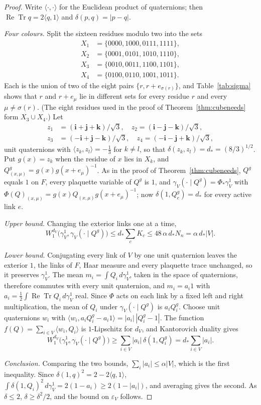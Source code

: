 \documentclass[aps,prd,twocolumn,superscriptaddress,nofootinbib,longbibliography,floatfix,amsmath,amssymb,10pt]{revtex4-2}
\theoremstyle{definition}
\theoremstyle{remark}
\newcommand{\ReTr}{\operatorname{Re}\operatorname{Tr}}
\begin{document}
\begin{proof}
Write $\langle\cdot,\cdot\rangle$ for the Euclidean product of quaternions;
then $\ReTr q=2\langle q,1\rangle$ and $\delta(p,q)=|p-q|$.

\emph{Four colours.} Split the sixteen residues modulo two into the sets
\[
\begin{aligned}
X_1&=\{0000,1000,0111,1111\},\\
X_2&=\{0001,0101,1010,1110\},\\
X_3&=\{0010,0011,1100,1101\},\\
X_4&=\{0100,0110,1001,1011\}.
\end{aligned}
\]
Each is the union of two of the eight pairs $\{r,r+e_{\sigma(r)}\}$, and
Table~\ref{tab:sigma} shows that $r$ and $r+e_\mu$ lie in different sets for
every residue $r$ and every $\mu\ne\sigma(r)$. (The eight residues used in the
proof of Theorem~\ref{thm:cubeneeds} form $X_3\cup X_4$.) Let
\[
\begin{split}
z_1&=(\mathbf i+\mathbf j+\mathbf k)/\sqrt3,\quad
z_2=(\mathbf i-\mathbf j-\mathbf k)/\sqrt3,\\
z_3&=(-\mathbf i+\mathbf j-\mathbf k)/\sqrt3,\quad
z_4=(-\mathbf i-\mathbf j+\mathbf k)/\sqrt3,
\end{split}
\]
unit quaternions with $\langle z_k,z_l\rangle=-\frac13$ for $k\ne l$, so that
$\delta(z_k,z_l)=d_*=(8/3)^{1/2}$. Put $g(x)=z_k$ when the residue of $x$ lies
in $X_k$, and $Q^g_{(x,\mu)}=g(x)g(x+e_\mu)^{-1}$. As in the proof of
Theorem~\ref{thm:cubeneeds}, $Q^g$ equals $1$ on $F$, every plaquette
variable of $Q^g$ is $1$, and $\gamma_V(\cdot\mid Q^g)=\Phi_*\gamma^1_V$ with
$\Phi(Q)_{(x,\mu)}=g(x)Q_{(x,\mu)}g(x+e_\mu)^{-1}$; now
$\delta(1,Q^g_e)=d_*$ for every active link $e$.

\emph{Upper bound.} Changing the exterior links one at a time,
\[
W_1^{d_V}\bigl(\gamma^1_V,\gamma_V(\cdot\mid Q^g)\bigr)\le
d_*\sum_cK_c\le48\,\alpha\,d_*N_n=\alpha\,d_*|V| .
\]

\emph{Lower bound.} Conjugating every link of $V$ by one unit quaternion
leaves the exterior $1$, the links of $F$, Haar measure and every plaquette
trace unchanged, so it preserves $\gamma^1_V$. The mean $m_i=\int Q_i\,
d\gamma^1_V$, taken in the space of quaternions, therefore commutes with
every unit quaternion, and $m_i=a_i1$ with $a_i=\frac12\int\ReTr Q_i\,
d\gamma^1_V$ real. Since $\Phi$ acts on each link by a fixed left and right
multiplication, the mean of $Q_i$ under $\gamma_V(\cdot\mid Q^g)$ is $a_iQ^g_i$.
Choose unit quaternions $w_i$ with $\langle w_i,a_iQ^g_i-a_i1\rangle=
|a_i|\,|Q^g_i-1|$. The function $f(Q)=\sum_{i\in V}\langle w_i,Q_i\rangle$ is
$1$-Lipschitz for $d_V$, and Kantorovich duality gives
\[
W_1^{d_V}\bigl(\gamma^1_V,\gamma_V(\cdot\mid Q^g)\bigr)\ge
\sum_{i\in V}|a_i|\,\delta(1,Q^g_i)=d_*\sum_{i\in V}|a_i| .
\]

\emph{Conclusion.} Comparing the two bounds, $\sum_i|a_i|\le\alpha|V|$,
which is the first inequality. Since $\delta(1,q)^2=2-2\langle q,1\rangle$,
$\int\delta(1,Q_i)^2\,d\gamma^1_V=2(1-a_i)\ge2(1-|a_i|)$, and averaging gives
the second. As $\delta\le2$, $\delta\ge\delta^2/2$, and the bound on
$\varepsilon_V$ follows.
\end{proof}
\end{document}
